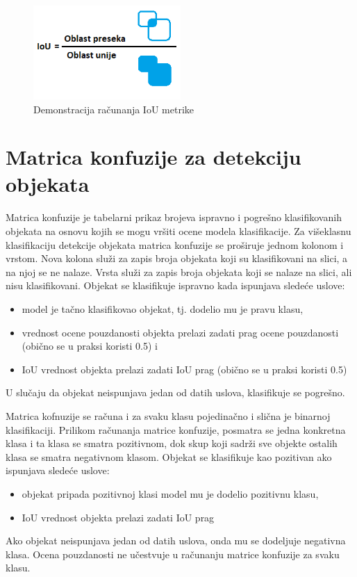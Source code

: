 \documentclass[12pt,oneside]{memoir}
\begin{document}
\begin{figure}[!ht]
    \centering
    \includegraphics[width=0.5\textwidth]{matfmaster/glava3/iou_calc_cus.png}
    \caption{Demonstracija računanja IoU metrike}
    \label{fig:section3_iou_calc}
\end{figure}



\section{Matrica konfuzije za detekciju objekata}

Matrica konfuzije je tabelarni prikaz brojeva ispravno i pogrešno klasifikovanih objekata na osnovu kojih se mogu vršiti ocene modela klasifikacije. Za višeklasnu klasifikaciju detekcije objekata matrica konfuzije se proširuje jednom kolonom i vrstom. Nova kolona služi za zapis broja objekata koji su klasifikovani na slici, a na njoj se ne nalaze. Vrsta služi za zapis broja objekata koji se nalaze na slici, ali nisu klasifikovani.
Objekat se klasifikuje ispravno kada ispunjava sledeće uslove:
\begin{itemize}
    \item model je tačno klasifikovao objekat, tj. dodelio mu je pravu klasu,
    \item vrednost ocene pouzdanosti objekta prelazi zadati prag ocene pouzdanosti (obično se u praksi koristi 0.5) i 
    \item IoU vrednost objekta prelazi zadati IoU prag (obično se u praksi koristi 0.5)
\end{itemize}
U slučaju da objekat neispunjava jedan od datih uslova, klasifikuje se pogrešno. 


Matrica kofnuzije se računa i za svaku klasu pojedinačno i slična je binarnoj klasifikaciji. Prilikom računanja matrice konfuzije, posmatra se jedna konkretna klasa i ta klasa se smatra pozitivnom, dok skup koji sadrži sve objekte ostalih klasa se smatra negativnom klasom. %
Objekat se klasifikuje kao pozitivan ako ispunjava sledeće uslove:
\begin{itemize}
    \item objekat pripada pozitivnoj klasi model mu je dodelio pozitivnu klasu,
    \item IoU vrednost objekta prelazi zadati IoU prag
\end{itemize}
Ako objekat neispunjava jedan od datih uslova, onda mu se dodeljuje negativna klasa. Ocena pouzdanosti ne učestvuje u računanju matrice konfuzije za svaku klasu.
\end{document}
